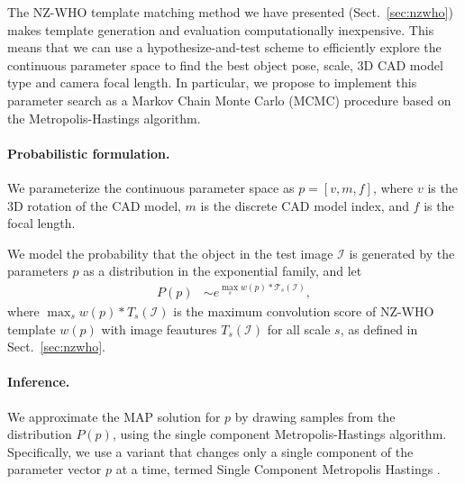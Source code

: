 The NZ-WHO template matching method we have presented
(Sect.~\ref{sec:nzwho}) makes template generation and evaluation
computationally inexpensive. This means that we can use a
hypothesize-and-test scheme to efficiently explore the continuous
parameter space to find the best object pose, scale, 3D CAD model type
and camera focal length.
%
In particular, we propose to implement this parameter search as a
Markov Chain Monte Carlo (MCMC) procedure based on the
Metropolis-Hastings algorithm.

\paragraph{Probabilistic formulation.}
We parameterize the continuous parameter space as  $p = [v, m, f]$,
where $v$ is the 3D rotation of the CAD model, $m$ is the discrete CAD
model index, and $f$ is the focal length.

We model the probability that the object in the test image
$\mathcal{I}$ is generated by the parameters $p$ as a distribution in
the exponential family, and let
\begin{align}
    P(p) & \sim e^{ \max_{s} w(p) \ast \mathcal{T}_s(\mathcal{I})},
\end{align}
where $\max_{s} w(p) \ast T_s(\mathcal{I})$ is the maximum convolution score of
NZ-WHO template $w(p)$ with image feautures $T_s(\mathcal{I})$ for all scale $s$, as defined
in Sect.~\ref{sec:nzwho}. 

\paragraph{Inference.}
We approximate the MAP solution for $p$ by drawing samples from the
distribution $P(p)$, using the single component Metropolis-Hastings
algorithm. Specifically, we use a variant that changes only a single
component of the parameter vector $p$ at a time, termed Single
Component Metropolis Hastings \cite{mcmc}.


